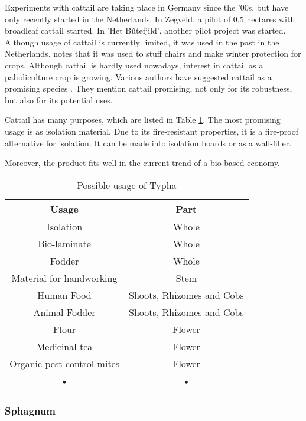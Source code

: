 \documentclass[a4paper,12pt]{scrbook}
\begin{document}
Experiments with cattail are taking place in Germany since the '00s, but have only recently started in the Netherlands. In Zegveld, a pilot of 0.5 hectares with broadleaf cattail started. In 'Het B\^utefjild', another pilot project was started. Although usage of cattail is currently limited, it was used in the past in the Netherlands. \citet{morton1975cattails} notes that it was used to stuff chairs and make winter protection for crops. Although cattail is hardly used nowadays, interest in cattail as a paludiculture crop is growing. Various authors have suggested cattail as a promising species \citep{morton1975cattails, heinz2011population}. They mention cattail promising, not only for its robustness, but also for its potential uses. 

Cattail has many purposes, which are listed in Table \ref{tab:typha}. The most promising usage is as isolation material. Due to its fire-resistant properties, it is a fire-proof alternative for isolation. It can be made into isolation boards or as a wall-filler. 

Moreover, the product fits well in the current trend of a bio-based economy.


\begin{table}
\centering
\caption{Possible usage of Typha}
\begin{tabular}{|c|c|}
\hline 
\textbf{Usage} & \textbf{Part} \\ 
\hline 
Isolation & Whole \\ 
\hline 
Bio-laminate & Whole \\ 
\hline 
Fodder & Whole \\ 
\hline 
Material for handworking & Stem \\ 
\hline 
Human Food & Shoots, Rhizomes and Cobs \\ 
\hline 
Animal Fodder & Shoots, Rhizomes and Cobs \\ 
\hline 
Flour & Flower \\ 
\hline 
Medicinal tea & Flower \\ 
\hline 
Organic pest control mites & Flower \\ 
\hline 
• & • \\ 
\hline 
\end{tabular} 
\label{tab:typha}
\end{table}

\subsubsection{Sphagnum}
\end{document}
